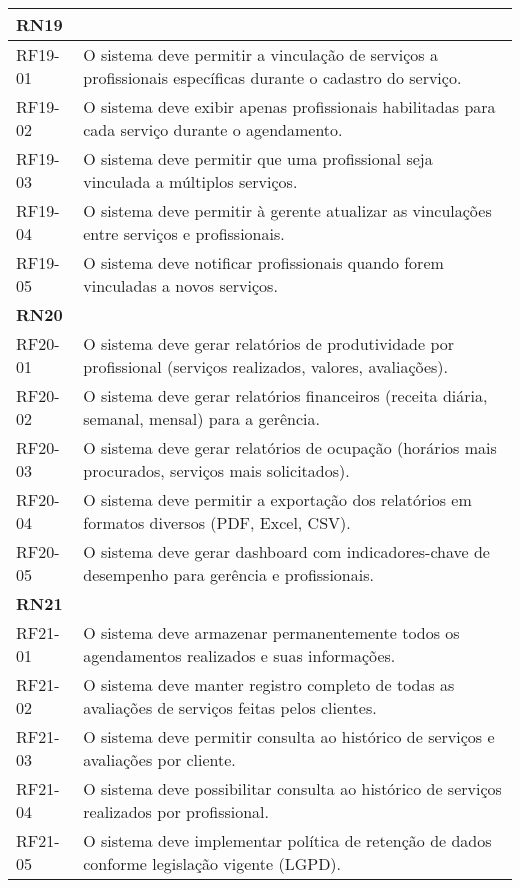 \begin{longtable}{|p{}|p{}|}
	\multicolumn{2}{|l|}{\textbf{RN19}} \\ \hline
	RF19-01 & O sistema deve permitir a vinculação de serviços a profissionais específicas durante o cadastro do serviço. \\ \hline
	RF19-02 & O sistema deve exibir apenas profissionais habilitadas para cada serviço durante o agendamento. \\ \hline
	RF19-03 & O sistema deve permitir que uma profissional seja vinculada a múltiplos serviços. \\ \hline
	RF19-04 & O sistema deve permitir à gerente atualizar as vinculações entre serviços e profissionais. \\ \hline
	RF19-05 & O sistema deve notificar profissionais quando forem vinculadas a novos serviços. \\ \hline
	
	\multicolumn{2}{|l|}{\textbf{RN20}} \\ \hline
	RF20-01 & O sistema deve gerar relatórios de produtividade por profissional (serviços realizados, valores, avaliações). \\ \hline
	RF20-02 & O sistema deve gerar relatórios financeiros (receita diária, semanal, mensal) para a gerência. \\ \hline
	RF20-03 & O sistema deve gerar relatórios de ocupação (horários mais procurados, serviços mais solicitados). \\ \hline
	RF20-04 & O sistema deve permitir a exportação dos relatórios em formatos diversos (PDF, Excel, CSV). \\ \hline
	RF20-05 & O sistema deve gerar dashboard com indicadores-chave de desempenho para gerência e profissionais. \\ \hline
	
	\multicolumn{2}{|l|}{\textbf{RN21}} \\ \hline
	RF21-01 & O sistema deve armazenar permanentemente todos os agendamentos realizados e suas informações. \\ \hline
	RF21-02 & O sistema deve manter registro completo de todas as avaliações de serviços feitas pelos clientes. \\ \hline
	RF21-03 & O sistema deve permitir consulta ao histórico de serviços e avaliações por cliente. \\ \hline
	RF21-04 & O sistema deve possibilitar consulta ao histórico de serviços realizados por profissional. \\ \hline
	RF21-05 & O sistema deve implementar política de retenção de dados conforme legislação vigente (LGPD). \\ \hline
	

\end{longtable}
